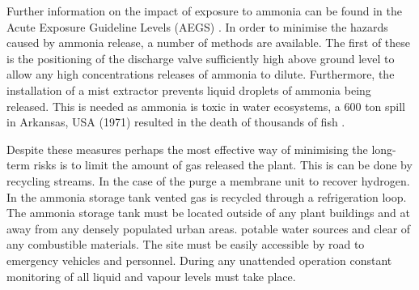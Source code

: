 Further information on the impact of exposure to ammonia can be found in the Acute Exposure Guideline Levels (AEGS) \cite{Michaels1998}. In order to minimise the hazards caused by ammonia release, a number of methods are available. The first of these is the positioning of the discharge valve sufficiently high above ground level to allow any high concentrations releases of ammonia to dilute. Furthermore, the installation of a mist extractor prevents liquid droplets of ammonia being released. This is needed as ammonia is toxic in  water ecosystems, a 600 ton spill in Arkansas, USA (1971) resulted in the death of thousands of fish \cite{Ojha2010}. 


Despite these measures perhaps the most effective way of minimising the long-term risks is to limit the amount of gas released the plant. This is can be done by recycling streams. In the case of the purge a membrane unit to recover hydrogen. In the ammonia storage tank vented gas is recycled through a refrigeration loop. The ammonia storage tank must be located outside of any plant buildings and at away from any densely populated urban areas. potable water sources and clear of any combustible materials. The site must be easily accessible by road to emergency vehicles and personnel. During any unattended operation constant monitoring of all liquid and vapour levels must take place.



%